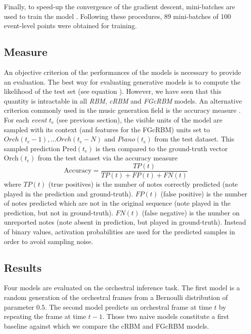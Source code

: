 \documentclass{article}
\begin{document}
Finally, to speed-up the convergence of the gradient descent, mini-batches are used to train the model \cite{bishop2006pattern}. Following these procedures, 89 mini-batches of 100 event-level points were obtained for training.

\subsection{Measure}
An objective criterion of the performances of the models is necessary to provide an evaluation. 
The best way for evaluating generative models is to compute the likelihood of the test set (see equation ). However, we have seen that this quantity is intractable in all \textit{RBM}, \textit{cRBM} and \textit{FGcRBM} models. 
An alternative criterion commonly used in the music generation field is the accuracy measure \cite{DBLP:journals/corr/YaoCVDD15,boulanger2012modeling,lavrenko2003polyphonic}. For each \textit{event} $t_{e}$ (see previous section), the visible units of the model are sampled with its context (and features for the FGcRBM) units set to $Orch(t_{e}-1),... Orch(t_{e}-N)$ and $Piano(t_{e})$ from the test dataset. This sampled prediction $\text{Pred}(t_{e})$ is then compared to the ground-truth vector $\text{Orch}(t_{e})$ from the test dataset via the accuracy measure
\begin{equation}
\text{Accuracy}  = \frac{TP(t)}{TP(t) + FP(t) + FN(t)}
\label{eq:accuracy}
\end{equation}
where $TP(t)$ (true positives) is the number of notes correctly predicted (note played in the prediction and ground-truth). $FP(t)$ (false positive) is the number of notes predicted which are not in the original sequence (note played in the prediction, but not in ground-truth). $FN(t)$ (false negative) is the number on unreported notes (note absent in prediction, but played in ground-truth). 
Instead of binary values, activation probabilities are used for the predicted samples in order to avoid sampling noise.

\subsection{Results}
Four models are evaluated on the orchestral inference task. The first model is a random generation of the orchestral frames from a Bernoulli distribution of parameter $0.5$. The second model predicts an orchestral frame at time $t$ by repeating the frame at time $t-1$. Those two naive models constitute a first baseline against which we compare the cRBM and FGcRBM models.
\end{document}
